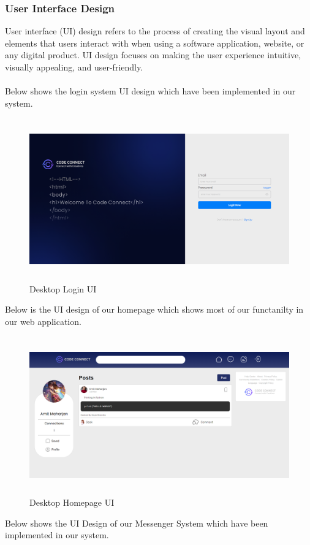 \subsubsection{User Interface Design}
User interface (UI) design refers to the process of creating the visual layout and elements that users interact with when using a software application, website, or any digital product. UI design focuses on making the user experience intuitive, visually appealing, and user-friendly. 
\\\\
Below shows the login system UI design which have been implemented in our system.
\begin{figure}[H]
    \centering
    \includegraphics[height = 7cm]{ui_diagrams/desktop_login.png}
    \caption{Desktop Login UI}
\end{figure}
Below is the UI design of our homepage which shows most of our functanilty in our web application.
\begin{figure}[H]
  \centering
  \includegraphics[height = 6.8cm]{ui_diagrams/desktop_homepage.png}
  \caption{Desktop Homepage UI}
\end{figure}
Below shows the UI Design of our Messenger System which have been implemented in our system.
